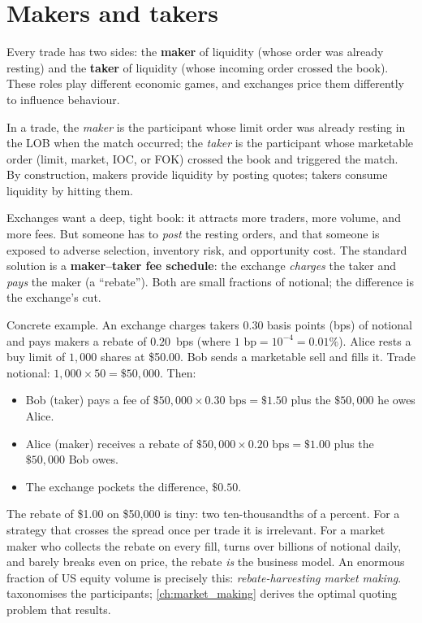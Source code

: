 \section{Makers and takers}
\label{sec:makers_takers}

Every trade has two sides: the \textbf{maker} of liquidity (whose
order was already resting) and the \textbf{taker} of liquidity (whose
incoming order crossed the book). These roles play different economic
games, and exchanges price them differently to influence behaviour.

\begin{definition}
In a trade, the \emph{maker} is the participant whose limit order
was already resting in the LOB when the match occurred; the
\emph{taker} is the participant whose marketable order (limit,
market, IOC, or FOK) crossed the book and triggered the match. By
construction, makers provide liquidity by posting quotes; takers
consume liquidity by hitting them.
\end{definition}

Exchanges want a deep, tight book: it attracts more traders, more
volume, and more fees. But someone has to \emph{post} the resting
orders, and that someone is exposed to adverse selection, inventory
risk, and opportunity cost. The standard solution is a
\textbf{maker--taker fee schedule}: the exchange \emph{charges} the
taker and \emph{pays} the maker (a ``rebate''). Both are small
fractions of notional; the difference is the exchange's cut.

Concrete example. An exchange charges takers $0.30$ basis points
(bps) of notional and pays makers a rebate of $0.20$~bps (where
$1\text{ bp} = 10^{-4} = 0.01\%$). Alice rests a buy limit of $1{,}000$
shares at \$50.00. Bob sends a marketable sell and fills it. Trade
notional: $1{,}000 \times 50 = \$50{,}000$. Then:

\begin{itemize}
  \item Bob (taker) pays a fee of $\$50{,}000 \times 0.30 \text{ bps}
  = \$1.50$ plus the $\$50{,}000$ he owes Alice.
  \item Alice (maker) receives a rebate of $\$50{,}000 \times 0.20
  \text{ bps} = \$1.00$ plus the $\$50{,}000$ Bob owes.
  \item The exchange pockets the difference, $\$0.50$.
\end{itemize}

The rebate of \$1.00 on \$50{,}000 is tiny: two ten-thousandths
of a percent. For a strategy that crosses the spread once per trade
it is irrelevant. For a market maker who collects the rebate on every
fill, turns over billions of notional daily, and barely breaks even
on price, the rebate \emph{is} the business model. An enormous
fraction of US equity volume is precisely this: \emph{rebate-harvesting
market making}.  taxonomises the participants;
\cref{ch:market_making} derives the optimal quoting problem that
results.

